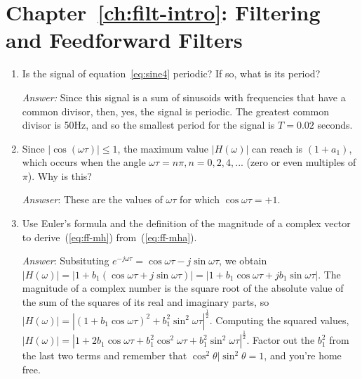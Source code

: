 \section{Chapter~\ref{ch:filt-intro}: Filtering and Feedforward Filters}
\label{sc:ch3ex}

\begin{enumerate}

\item Is the signal of equation~\ref{eq:sine4} periodic? If so, what
  is its period?\label{it:ch3ex0}

  \textit{Answer:} Since this signal is a sum of sinusoids with
  frequencies that have a common divisor, then, yes, the signal is
  periodic. The greatest common divisor is 50Hz, and so the smallest
  period for the signal is $T=0.02$ seconds.

\item Since $|\cos(\omega\tau)|\leq 1$, the maximum value
  $|H(\omega)|$ can reach is $(1+a_1)$, which occurs when the angle
  $\omega\tau=n\pi, n=0,2,4,...$ (zero or even multiples of
  $\pi$). Why is this?\label{it:ch3ex1}

  \textit{Answser}: These are the values of $\omega\tau$ for which
  $\cos\omega\tau=+1$.

\item Use Euler's formula and the definition of the magnitude of a
  complex vector to derive~(\ref{eq:ff-mh})
  from~(\ref{eq:ff-mha}).\label{it:ch3ex2}

  \textit{Answer}: Subsituting $e^{-j\omega \tau} = \cos\omega\tau -
  j\sin\omega\tau$, we obtain $|H(\omega)| = |1+b_1 (\cos\omega\tau +
  j\sin\omega\tau)| = |1+b_1 \cos\omega\tau + j
  b_1\sin\omega\tau|$. The magnitude of a complex number is the square
  root of the absolute value of the sum of the squares of its real and
  imaginary parts, so $|H(\omega)| = |(1+b_1 \cos\omega\tau)^2 +
  b_1^2\sin^2\omega\tau|^\frac{1}{2}$. Computing the squared values,
  $|H(\omega)| = |1 + 2b_1\cos\omega\tau + b_1^2\cos^2\omega\tau +
  b_1^2\sin^2\omega\tau|^{\frac{1}{2}}$. Factor out the $b_1^2$ from
  the last two terms and remember that $\cos^2\theta | \sin^2\theta =
  1$, and you're home free.



\end{enumerate}
